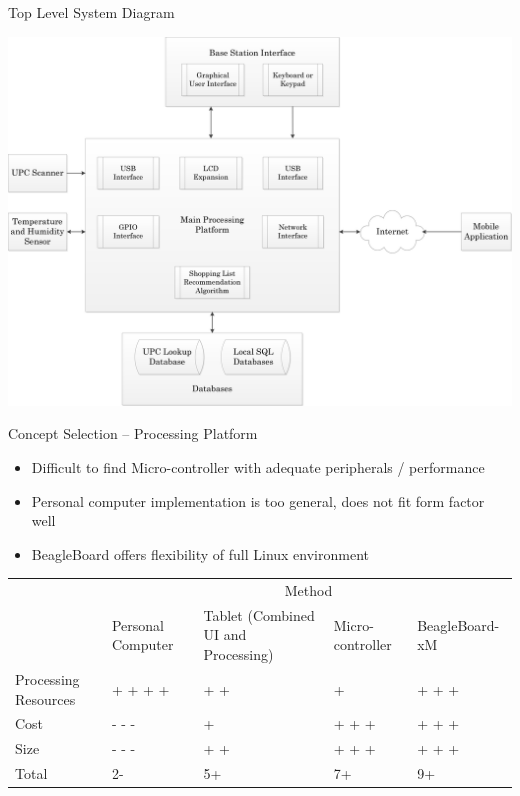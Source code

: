 \documentclass[t]{beamer}
\begin{document}
\begin{frame}{Top Level System Diagram}
\begin{center}
\includegraphics[scale=.3]{../Graphics/FullSystemDiagram}
\end{center}
\end{frame}

\begin{frame}{Concept Selection -- Processing Platform}
\begin{itemize}
\item Difficult to find Micro-controller with adequate peripherals / performance
\item Personal computer implementation is too general, does not fit form factor well
\item BeagleBoard offers flexibility of full Linux environment
\end{itemize}
\vspace{.5cm}
\footnotesize
\begin{tabular}{| p{.7in} | p{.7in} | p{1in} | p{0.7in} | p{.8in} | }
\cline{2-5}
\multicolumn{1}{c}{}&\multicolumn{4}{|c|}{Method} \\
\cline{2-5}
\multicolumn{1}{c|}{}&Personal \newline Computer&Tablet (Combined UI and Processing)&Micro-controller & BeagleBoard-xM\\
\hline
Processing Resources&+ + + +&+ +&+&+ + +\\
\hline
Cost &- - -& + &+ + +&+ + +\\
\hline
Size&- - -&+ +&+ + +& + + +\\
\hline
\hline
Total &2-&5+&7+& 9+\\
\hline
\end{tabular}
\end{frame}
\end{document}
